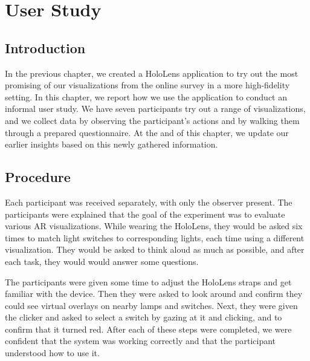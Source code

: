 \chapter{User Study} \label{chap:user}

\section{Introduction} \label{sec:user:survey:intro}
In the previous chapter, we created a HoloLens application to try out the most promising of our visualizations from the online survey in a more high-fidelity setting. In this chapter, we report how we use the application to conduct an informal user study. We have seven participants try out a range of visualizations, and we collect data by observing the participant's actions and by walking them through a prepared questionnaire. At the and of this chapter, we update our earlier insights based on this newly gathered information.

\section{Procedure} \label{sec:user:survey:procedure}
Each participant was received separately, with only the observer present. The participants were explained that the goal of the experiment was to evaluate various AR visualizations. While wearing the HoloLens, they would be asked six times to match light switches to corresponding lights, each time using a different visualization. They would be asked to think aloud as much as possible, and after each task, they would would answer some questions.

The participants were given some time to adjust the HoloLens straps and get familiar with the device. Then they were asked to look around and confirm they could see virtual overlays on nearby lamps and switches. Next, they were given the clicker and asked to select a switch by gazing at it and clicking, and to confirm that it turned red. After each of these steps were completed, we were confident that the system was working correctly and that the participant understood how to use it.

